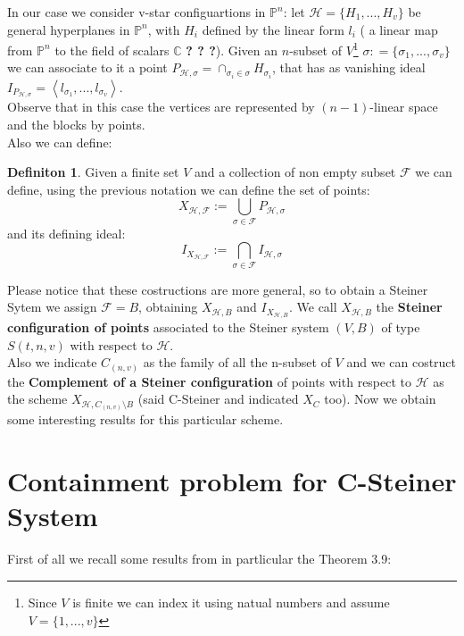 \documentclass[]{book}
\theoremstyle{plain}
\theoremstyle{remark}
\theoremstyle{definition}
\newtheorem{deff}[teo]{Definiton}
\newcommand{\C}{\mathbb{C}}
\newcommand{\PP}{\mathbb{P}}
\newcommand{\HH}{\mathcal{H}}
\begin{document}
In our case we consider v-star configuartions in $ \PP^n $: let $ \HH  = \{ H_1 , ... , H_v\}$ be general hyperplanes in $ \PP^n $, with $ H_i $ defined by the linear form $ l_i $ ( a linear map from $ \PP^n $ to the field of scalars $ \C $ \textbf{? ? ?}). Given an $ n $-subset of $ V $\footnote{Since $ V $ is finite we can index it using natual numbers and assume $ V = \{ 1 , ... , v\} $} $ \sigma : = \{ \sigma_1 , ... , \sigma_v\}$ we can associate to it a point $ P_{\HH, \sigma }= \cap_{\sigma_i \in \sigma} H_{\sigma_i}$, that has as vanishing ideal $ I_{P_{\HH, \sigma}} = \left< l_{\sigma_1} , ... , l_{\sigma_v} \right\rangle $.\\
 Observe that in this case the vertices are represented by $( n-1 )$-linear space and the blocks by points.\\
 Also we can define:
 \begin{deff}\label{def:gensys}
 Given a finite set $ V $ and a collection of non empty subset $ \mathcal{F} $ we can define, using the previous notation we can define the set of points:
 \begin{equation}\label{eq:X}
 X_{\HH , \mathcal{F}}:= \bigcup_{\sigma \in \mathcal{F} } P_{\HH, \sigma }
 \end{equation}
 and its defining ideal:
 \begin{equation}\label{eq:I}
 I_{X_{\HH , \mathcal{F}}}:= \bigcap_{\sigma \in \mathcal{F} } I_{\HH, \sigma }
 \end{equation}
 \end{deff}
 Please notice that these costructions are more general, so to obtain a Steiner Sytem we assign $ \mathcal{F}=B $, obtaining $ X_{\HH , B} $ and $  I_{X_{\HH , B}} $. 
 We call  $ X_{\HH , B} $ the \textbf{Steiner configuration of points} associated to the Steiner system $ (V , B) $ of type $ S(t , n,v) $ with respect to $ \HH $. \\
 Also we indicate $ C_{(n,v)} $ as the family of all the n-subset of $ V $ and we can costruct the \textbf{Complement of a Steiner configuration} of points with respect to $ \HH $ as the scheme $ X_{\HH , C_{(n,v)} \setminus B} $ (said C-Steiner and indicated $ X_C $ too).
Now we obtain some interesting results for this particular scheme. 
 
 \section{Containment problem for C-Steiner System}
 
 First of all we recall some results from \cite{Bal20Steiner} in partlicular the Theorem 3.9:
 
\end{document}
